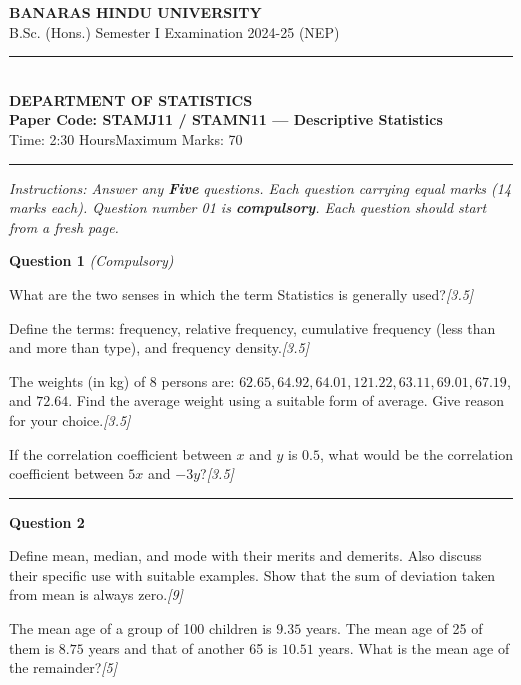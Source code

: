\documentclass[11pt,a4paper]{article}
\newcommand{\pts}[1]{\hfill   \textit{[#1]}}
\begin{document}
\begin{center}
  {\large\bfseries BANARAS HINDU UNIVERSITY}\\[2pt]
  {\normalsize B.Sc. (Hons.) Semester I Examination 2024-25 (NEP)}\\[6pt]
  \rule{0.8\linewidth}{0.5pt}\\[6pt]
  {\large\bfseries DEPARTMENT OF STATISTICS}\\[4pt]
  {\large\bfseries Paper Code: STAMJ11 / STAMN11 --- Descriptive Statistics}\\[4pt]
  {\normalsize Time: 2:30 Hours\hfill Maximum Marks: 70}
\end{center}

\rule{\linewidth}{0.4pt}

\smallskip



\noindent   \textit{Instructions: Answer any   \textbf{Five} questions. Each question carrying equal marks (14 marks each). Question number 01 is   \textbf{compulsory}. Each question should start from a fresh page.}

\bigskip




\noindent   \textbf{Question 1}   \textit{(Compulsory)}

\begin{parts}
  \item What are the two senses in which the term Statistics is generally used?\pts{3.5}
  \item Define the terms: frequency, relative frequency, cumulative frequency (less than and more than type), and frequency density.\pts{3.5}
  \item The weights (in kg) of 8 persons are: $62.65, 64.92, 64.01, 121.22, 63.11, 69.01, 67.19$, and $72.64$. Find the average weight using a suitable form of average. Give reason for your choice.\pts{3.5}
  \item If the correlation coefficient between $x$ and $y$ is $0.5$, what would be the correlation coefficient between $5x$ and $-3y$?\pts{3.5}
\end{parts}

\medskip\rule{\linewidth}{0.2pt}\medskip




\noindent   \textbf{Question 2}

\begin{parts}
  \item Define mean, median, and mode with their merits and demerits. Also discuss their specific use with suitable examples. Show that the sum of deviation taken from mean is always zero.\pts{9}
  \item The mean age of a group of 100 children is $9.35$ years. The mean age of 25 of them is $8.75$ years and that of another 65 is $10.51$ years. What is the mean age of the remainder?\pts{5}
\end{parts}
\end{document}
